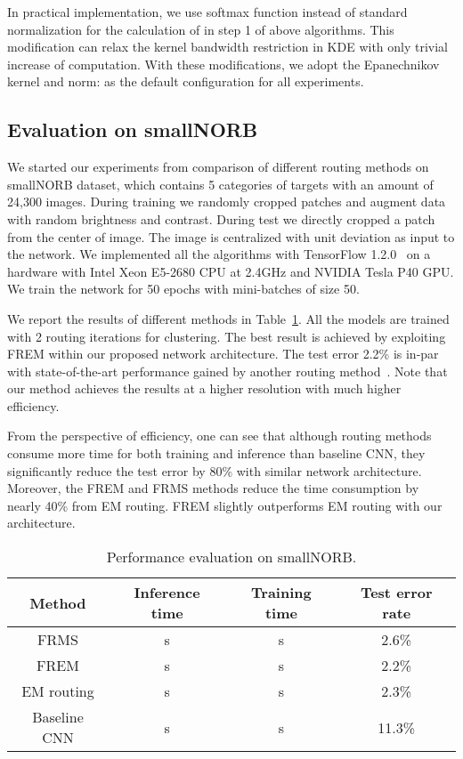 \documentclass[runningheads]{llncs}
\begin{document}
In practical implementation, we use softmax function instead of standard normalization for the calculation of  in step 1 of above algorithms. This modification can relax the kernel bandwidth restriction in KDE with only trivial increase of computation. With these modifications, we adopt the Epanechnikov kernel and  norm:  as the default configuration for all experiments.

\subsection{Evaluation on smallNORB}
We started our experiments from comparison of different routing methods on smallNORB dataset, which contains 5 categories of targets with an amount of 24,300  images. During training we randomly cropped  patches and augment data with random brightness and contrast. During test we directly cropped a  patch from the center of image. The image is centralized with unit deviation as input to the network. We implemented all the algorithms with TensorFlow 1.2.0~\cite{abadi2016tensorflow} on a hardware with Intel Xeon E5-2680 CPU at 2.4GHz and NVIDIA Tesla P40 GPU. We train the network for 50 epochs with mini-batches of size 50. 

We report the results of different methods in Table~\ref{tab:norb}. All the models are trained with 2 routing iterations for clustering. The best result is achieved by exploiting FREM within our proposed network architecture. The test error 2.2\% is in-par with state-of-the-art performance gained by another routing method~\cite{hinton2018emrouting}. Note that our method achieves the results at a higher resolution with much higher efficiency. 

From the perspective of efficiency, one can see that although routing methods consume more time for both training and inference than baseline CNN, they significantly reduce the test error by 80\% with similar network architecture. Moreover, the FREM and FRMS methods reduce the time consumption by nearly 40\% from EM routing. FREM slightly outperforms EM routing with our architecture.
\begin{table}
\centering
\caption{Performance evaluation on smallNORB.}
\label{tab:norb}
\begin{tabular}{cccc}
\toprule
Method & Inference time & Training time & Test error rate  \\
\midrule
FRMS & s & s & 2.6\% \\
FREM & s & s & 2.2\%\\
EM routing & s & s & 2.3\%\\
Baseline CNN & s & s & 11.3\%\\
\bottomrule
\end{tabular}
\end{table}
\end{document}
